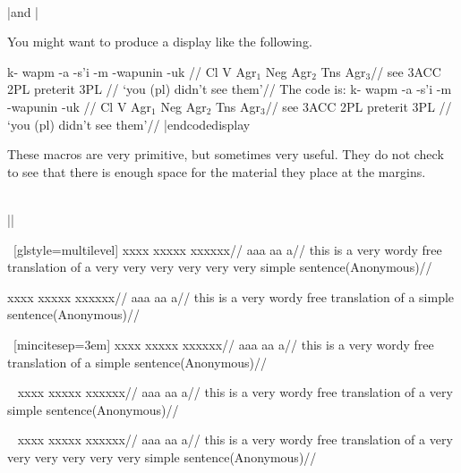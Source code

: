 \bigskip
\\ |\rightcomment and \leftcomment|\medskip

You might want to produce a display like the following.

\framedisplay
\ex[glstyle=multilevel,textoffset=1in]
\begingl
\gla \rightcomment{\rm [Potawatami]}k- wapm -a -s'i -m -wapunin -uk //
\glb {}%
   Cl V Agr$_1$ Neg Agr$_2$ Tns Agr$_3$//
 see {3\sc ACC} {} 2{\sc PL} preterit 3{\sc PL} //
\glft \leavevmode{}
   `you (pl) didn't see them'//
\endgl
\xe
\endframedisplay
The code is:
\codedisplay
\ex[glstyle=multilevel,textoffset=1.5in]
\begingl
\gla \rightcomment{\rm [Potawatami]}k- wapm -a -s'i -m -wapunin -uk //
\glb {}%
   Cl V Agr$_1$ Neg Agr$_2$ Tns Agr$_3$//
 see {3\sc ACC} {} 2{\sc PL} preterit 3{\sc PL} //
\glft \leavevmode{}
   `you (pl) didn't see them'//
\endgl
\xe
|endcodedisplay

These macros are very primitive, but sometimes very useful.  They
do not check to see that there is enough space for the material
they place at the margins.

\bigskip
\\ |\pushciteright|\medskip

\ex~[glstyle=multilevel]
\begingl
\gla xxxx xxxxx xxxxxx//
\glb aaa aa a//
\glft this is a very wordy free translation
of a very very very
very very very
simple sentence\hfill (Anonymous)//
\endgl
\xe


\ex
\begingl
\gla xxxx xxxxx xxxxxx//
\glb aaa aa a//
\glft this is a very wordy free translation
of a simple sentence\pushciteright (Anonymous)//
\endgl
\xe

\ex~[mincitesep=3em]
\begingl
\gla xxxx xxxxx xxxxxx//
\glb aaa aa a//
\glft this is a very wordy free translation
of a simple sentence\pushciteright (Anonymous)//
\endgl
\xe

\ex~
\begingl
\gla xxxx xxxxx xxxxxx//
\glb aaa aa a//
\glft this is a very wordy free translation
of a very simple sentence\pushciteright (Anonymous)//
\endgl
\xe

\ex~
\begingl
\gla xxxx xxxxx xxxxxx//
\glb aaa aa a//
\glft this is a very wordy free translation
of a very very very
very very very
simple sentence\pushciteright (Anonymous)//
\endgl
\xe


\endinput



